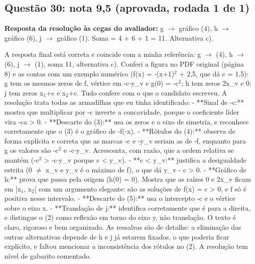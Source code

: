 \documentclass{article}%
\begin{document}
\subsection*{Questão 30: nota 9,5 (aprovada, rodada 1 de 1)}%
\textbf{Resposta da resolução às cegas do avaliador:} g $\to$ gráfico (4), h $\to$ gráfico (6), j $\to$ gráfico (1). Soma = 4 + 6 + 1 = 11. Alternativa c).\par %
A resposta final está correta e coincide com a minha referência: g $\to$ (4), h $\to$ (6), j $\to$ (1), soma 11, alternativa c). Conferi a figura no PDF original (página 8) e as contas com um exemplo numérico (f(x) = -(x+1)$^2$ + 2,5, que dá c = 1,5): g tem os mesmos zeros de f, vértice em -c$\cdot$y\_v e g(0) = -c$^2$; h tem zeros 2x\_v e 0; j tem zeros x$_{1}$+c e x$_{2}$+c. Tudo confere com o que o candidato escreveu.\newline%
\newline%
A resolução trata todas as armadilhas que eu tinha identificado:\newline%
{-} **Sinal de -c:** mostra que multiplicar por -c inverte a concavidade, porque o coeficiente líder vira -ca > 0.\newline%
{-} **Descarte do (3):** usa os zeros e o eixo de simetria, e reconhece corretamente que o (3) é o gráfico de -f(-x).\newline%
{-} **Rótulos do (4):** observa de forma explícita e correta que as marcas -c e -y\_v seriam as de -f, enquanto para g os valores são -c$^2$ e -c$\cdot$y\_v. Acrescenta, com razão, que a ordem relativa se mantém (-c$^2$ > -c$\cdot$y\_v porque c < y\_v).\newline%
{-} **c < y\_v:** justifica a desigualdade estrita (0 $\neq$ x\_v e y\_v é o máximo de f), o que dá y\_v - c > 0.\newline%
{-} **Gráfico de h:** prova que passa pela origem (h(0) = 0). Mostra que as raízes 0 e 2x\_v ficam em {]}x$_{1}$, x$_{2}${[} com um argumento elegante: são as soluções de f(x) = c > 0, e f só é positiva nesse intervalo.\newline%
{-} **Descarte do (5):** usa o intercepto -c e o vértice sobre o eixo x.\newline%
{-} **Translação de j:** identifica corretamente que é para a direita, e distingue o (2) como reflexão em torno do eixo y, não translação.\newline%
\newline%
O texto é claro, rigoroso e bem organizado. As ressalvas são de detalhe: a eliminação das outras alternativas depende de h e j já estarem fixados, o que poderia ficar explícito, e faltou mencionar a inconsistência dos rótulos no (2). A resolução tem nível de gabarito comentado.%
\end{document}
